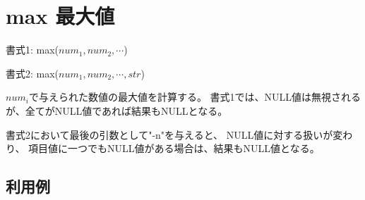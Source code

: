 
%

\section{max 最大値\label{sect:max}}

書式1: max($num_1,num_2,\cdots$)

書式2: max($num_1,num_2,\cdots,str$)

$num_i$で与えられた数値の最大値を計算する。
書式1では、NULL値は無視されるが、全てがNULL値であれば結果もNULLとなる。

書式2において最後の引数として"-n"を与えると、
NULL値に対する扱いが変わり、
項目値に一つでもNULL値がある場合は、結果もNULL値となる。

\subsection*{利用例}


%

